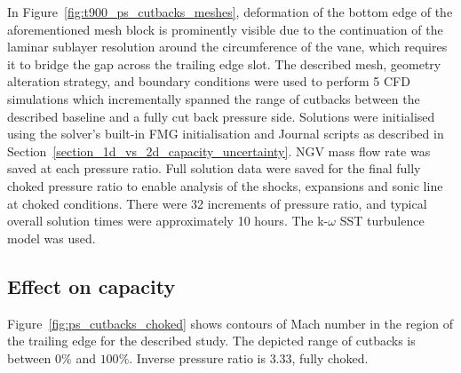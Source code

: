 \documentclass[a4paper, 11pt, oneside]{report}
\begin{document}
In Figure~\ref{fig:t900_ps_cutbacks_meshes}, deformation of the bottom edge of the aforementioned mesh block is prominently visible due to the continuation of the laminar sublayer resolution around the circumference of the vane, which requires it to bridge the gap across the trailing edge slot. The described mesh, geometry alteration strategy, and boundary conditions were used to perform 5 CFD simulations which incrementally spanned the range of cutbacks between the described baseline and a fully cut back pressure side. Solutions were initialised using the solver's built-in FMG initialisation and Journal scripts as described in Section~\ref{section_1d_vs_2d_capacity_uncertainty}. NGV mass flow rate was saved at each pressure ratio. Full solution data were saved for the final fully choked pressure ratio to enable analysis of the shocks, expansions and sonic line at choked conditions. There were 32 increments of pressure ratio, and typical overall solution times were approximately 10 hours. The k-$\omega$ SST turbulence model was used.

\subsection{Effect on capacity}

Figure~\ref{fig:ps_cutbacks_choked} shows contours of Mach number in the region of the trailing edge for the described study. The depicted range of cutbacks is between $0\%$ and $100\%$. Inverse pressure ratio is $3.33$, fully choked.
\end{document}
